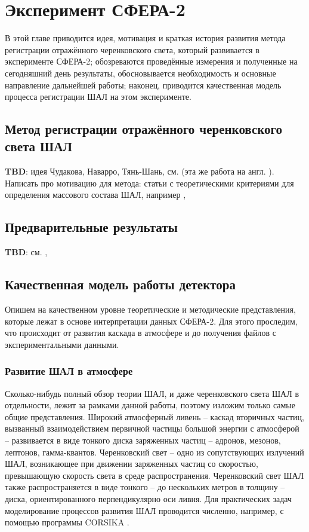 \chapter{Эксперимент СФЕРА-2}

В этой главе приводится идея, мотивация и краткая история развития метода регистрации отражённого черенковского света, который развивается в эксперименте СФЕРА-2; обозреваются проведённые измерения и полученные на сегодняшний день результаты, обосновывается необходимость и основные направление дальнейшей работы; наконец, приводится качественная модель процесса регистрации ШАЛ на этом эксперименте.

\section{Метод регистрации отражённого черенковского света ШАЛ}

\textbf{TBD}: идея Чудакова, Наварро, Тянь-Шань, см. \cite{chernov2015-overview} (эта же работа на англ. \cite{Sphere2015}). Написать про мотивацию для метода: статьи с теоретическими критериями для определения массового состава ШАЛ, например \cite{Anokhina2007}, \cite{Chernov2017-ICRC}

\section{Предварительные результаты}

\textbf{TBD}: см. \cite{Antonov2013}, 

\section{Качественная модель работы детектора}

Опишем на качественном уровне теоретические и методические представления, которые лежат в основе интерпретации данных СФЕРА-2. Для этого проследим, что происходит от развития каскада в атмосфере и до получения файлов с экспериментальными данными.

\subsection{Развитие ШАЛ в атмосфере}

Сколько-нибудь полный обзор теории ШАЛ, и даже черенковского света ШАЛ в отдельности, лежит за рамками данной работы, поэтому изложим только самые общие представления. Широкий атмосферный ливень -- каскад вторичных частиц, вызванный взаимодействием первичной частицы большой энергии с атмосферой -- развивается в виде тонкого диска заряженных частиц -- адронов, мезонов, лептонов, гамма-квантов. Черенковский свет -- одно из сопутствующих излучений ШАЛ, возникающее при движении заряженных частиц со скоростью, превышающую скорость света в среде распространения. Черенковский свет ШАЛ также распространяется в виде тонкого -- до нескольких метров в толщину -- диска, ориентированного перпендикулярно оси ливня. Для практических задач моделирование процессов развития ШАЛ проводится численно, например, с помощью программы CORSIKA \cite{CORSIKA-report}.

